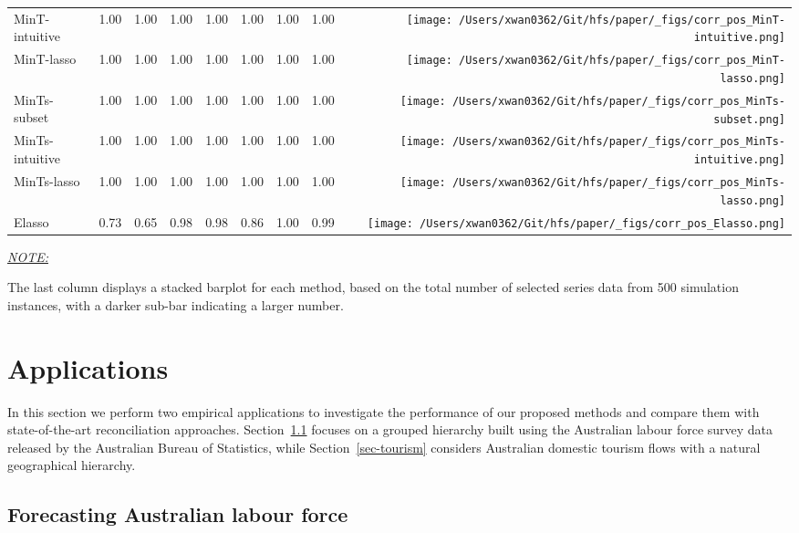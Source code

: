 \documentclass[11pt,a4paper,]{article}
\begin{document}
\begin{table}[!h]
{\begin{threeparttable}
\begin{tabular}{llrrrrrr>{}r}
MinT-intuitive & 1.00 & 1.00 & 1.00 & 1.00 & 1.00 & 1.00 & 1.00 & \texttt{[image: /Users/xwan0362/Git/hfs/paper/\_figs/corr\_pos\_MinT-intuitive.png]}\\
MinT-lasso & 1.00 & 1.00 & 1.00 & 1.00 & 1.00 & 1.00 & 1.00 & \texttt{[image: /Users/xwan0362/Git/hfs/paper/\_figs/corr\_pos\_MinT-lasso.png]}\\
\midrule
MinTs-subset & 1.00 & 1.00 & 1.00 & 1.00 & 1.00 & 1.00 & 1.00 & \texttt{[image: /Users/xwan0362/Git/hfs/paper/\_figs/corr\_pos\_MinTs-subset.png]}\\
MinTs-intuitive & 1.00 & 1.00 & 1.00 & 1.00 & 1.00 & 1.00 & 1.00 & \texttt{[image: /Users/xwan0362/Git/hfs/paper/\_figs/corr\_pos\_MinTs-intuitive.png]}\\
MinTs-lasso & 1.00 & 1.00 & 1.00 & 1.00 & 1.00 & 1.00 & 1.00 & \texttt{[image: /Users/xwan0362/Git/hfs/paper/\_figs/corr\_pos\_MinTs-lasso.png]}\\
\midrule
Elasso & 0.73 & 0.65 & 0.98 & 0.98 & 0.86 & 1.00 & 0.99 & \texttt{[image: /Users/xwan0362/Git/hfs/paper/\_figs/corr\_pos\_Elasso.png]}\\
\bottomrule
\end{tabular}
\begin{tablenotes}[para]
\item \underline{\textit{NOTE:}} 
\item The last column displays a stacked barplot for each method, based on the total number of selected series data from 500 simulation instances, with a darker sub-bar indicating a larger number.
\end{tablenotes}
\end{threeparttable}}
\endgroup{}
\end{table}

\hypertarget{sec-applications}{%
\section{Applications}\label{sec-applications}}

In this section we perform two empirical applications to investigate the
performance of our proposed methods and compare them with
state-of-the-art reconciliation approaches. Section~\ref{sec-labour}
focuses on a grouped hierarchy built using the Australian labour force
survey data released by the Australian Bureau of Statistics, while
Section~\ref{sec-tourism} considers Australian domestic tourism flows
with a natural geographical hierarchy.

\hypertarget{sec-labour}{%
\subsection{Forecasting Australian labour force}\label{sec-labour}}
\end{document}
